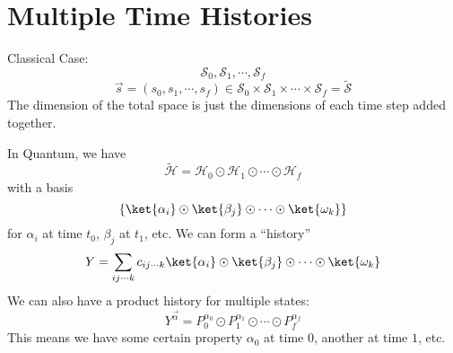 \documentclass[a4paper,twoside,master.tex]{subfiles}
\begin{document}
\chapter{Multiple Time Histories}

Classical Case:
\begin{equation}
\mathscr{S}_0,\mathscr{S}_1,\cdots,\mathscr{S}_f
\end{equation}
\begin{equation}
  \vec{s} = (s_0,s_1,\cdots,s_f)\in \mathscr{S}_0\times\mathscr{S}_1\times\cdots\times\mathscr{S}_f=\tilde{\mathscr{S}}
\end{equation}
The dimension of the total space is just the dimensions of each time step added together.

In Quantum, we have
\begin{equation}
  \tilde{\mathscr{H}}=\mathscr{H}_0\odot\mathscr{H}_1\odot\cdots\odot\mathscr{H}_f
\end{equation}
with a basis
\begin{equation}
  \{\ket{\alpha_i}\odot\ket{\beta_j}\odot\cdots\odot\ket{\omega_k}\}
\end{equation}
for $\alpha_i$ at time $t_0$, $\beta_j$ at $t_1$, etc.
We can form a ``history''
\begin{equation}
  Y = \sum_{ij\cdots k} c_{ij\cdots k}\ket{\alpha_i}\odot\ket{\beta_j}\odot\cdots\odot\ket{\omega_k}
\end{equation}
We can also have a product history for multiple states:
\begin{equation}
  Y^{\vec{\alpha}} = P_0^{\alpha_0}\odot P_1^{\alpha_1}\odot\cdots\odot P_f^{\alpha_f}
\end{equation}
This means we have some certain property $\alpha_0$ at time $0$, another at time $1$, etc.
\end{document}
